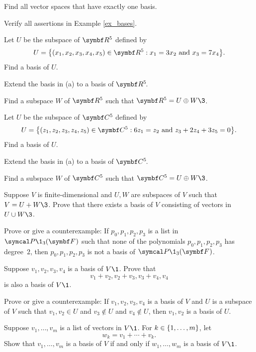 \begin{exercises}

\exercise
Find all vector spaces that have exactly one basis.


\exercise
Verify all assertions in Example \ref{ex_bases}.


\exercise
\begin{SUBtheorem}
\item
Let $U$ be the subspace of $\R{5}$ defined by
\[
U =
\br[\big]{ (x_1, x_2, x_3, x_4, x_5) \in \R{5}: x_1 = 3 x_2 \mbox{\ and\ } x_3 = 7x_4}.
\]
Find a basis of $U$.
\item
Extend the basis in (a) to a basis of $\RR5$.
\item
Find a subspace $W$ of $\R5$ such that $\R5 = U \oplus W\3$.
\end{SUBtheorem}


\exercise
\begin{SUBtheorem}
\item
Let $U$ be the subspace of $\C{5}$ defined by
\[
U =
\br[\big]{ (z_1, z_2, z_3, z_4, z_5) \in \C{5}: 6 z_1 = z_2 \mbox{\ and\ } z_3 + 2z_4 + 3z_5 = 0}.
\]
Find a basis of $U$.
\item
Extend the basis in (a) to a basis of $\CC5$.
\item
Find a subspace $W$ of $\C5$ such that $\C5 = U \oplus W\3$.
\end{SUBtheorem}


\exercise
Suppose $V$ is finite-dimensional and $U, W$ are subspaces of $V$ such that $V = U + W\3$. Prove that there exists a basis of $V$ consisting of vectors in $U \cup W\3$.


\exercise
Prove or give a counterexample: If $p_0, p_1, p_2, p_3$ is a list in $\P\1_3(\F{})$ such
that none of the polynomials $p_0, p_1, p_2, p_3$ has degree~$2$, then $p_0, p_1, p_2, p_3$ is not a basis of $\P\1_3(\F{})$.


\exercise
Suppose $v_1, v_2, v_3, v_4$ is a basis of $V\1$. Prove that
\[
v_1 + v_2, v_2 + v_3, v_3 + v_4, v_4
\]
is also a basis of $V\1$.


\exercise
Prove or give a counterexample: If $v_1, v_2, v_3, v_4$ is a basis of $V$ and $U$ is a subspace of $V$ such that $v_1, v_2 \in U$ and $v_3 \notin U$ and $v_4 \notin U$, then $v_1, v_2$ is a basis of $U$.


\exercise
Suppose $v_1, \ldots, v_m$ is a list of vectors in $V\1$. For $k \in \{1, \ldots, m\}$, let
\[
w_k = v_1 + \cdots + v_k.
\]
Show that $v_1, \ldots, v_m$ is a basis of $V$ if and only if $w_1, \ldots, w_m$ is a basis of $V\1$.



\end{exercises}
